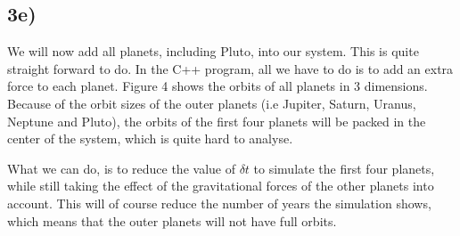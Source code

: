 \documentclass[12pt]{article}
\begin{document}
\newpage

\subsection*{3e)}
We will now add all planets, including Pluto, into our system. This is quite straight forward to do. In the C++ program, all we have to do is to add an extra force to each planet. Figure 4 shows the orbits of all planets in 3 dimensions. Because of the orbit sizes of the outer planets (i.e Jupiter, Saturn, Uranus, Neptune and Pluto), the orbits of the first four planets will be packed in the center of the system, which is quite hard to analyse. 

What we can do, is to reduce the value of $\delta t$ to simulate the first four planets, while still taking the effect of the gravitational forces of the other planets into account. This will of course reduce the number of years the simulation shows, which means that the outer planets will not have full orbits.
\end{document}
